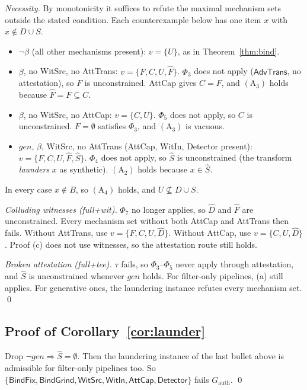 \emph{Necessity.} By monotonicity it suffices to refute the maximal mechanism sets outside
the stated condition. Each counterexample below has one item $x$ with $x\notin D\cup S$.
\begin{itemize}
\item $\neg\beta$ (all other mechanisms present): $v=\{U\}$, as in Theorem~\ref{thm:bind}.
\item $\beta$, no \textsf{WitSrc}, no \textsf{AttTrans}: $v=\{F,C,U,\hat F\}$. $\Phi_3$ does not
  apply ($\textsf{AdvTrans}$, no attestation), so $F$ is unconstrained.
  \textsf{AttCap} gives $C=F$, and $(\mathrm A_3)$ holds because $\hat F=F\subseteq C$.
\item $\beta$, no \textsf{WitSrc}, no \textsf{AttCap}: $v=\{C,U\}$. $\Phi_5$ does not apply,
  so $C$ is unconstrained. $F=\emptyset$ satisfies $\Phi_3$, and $(\mathrm A_3)$ is vacuous.
\item $\mathit{gen}$, $\beta$, \textsf{WitSrc}, no \textsf{AttTrans} (\textsf{AttCap},
  \textsf{WitIn}, \textsf{Detector} present): $v=\{F,C,U,\hat F,\hat S\}$. $\Phi_4$ does not
  apply, so $\hat S$ is unconstrained (the transform \emph{launders} $x$ as synthetic).
  $(\mathrm A_2)$ holds because $x\in\hat S$.
\end{itemize}
In every case $x\notin B$, so $(\mathrm A_4)$ holds, and $U\not\subseteq D\cup S$.

\emph{Colluding witnesses (full+wit).} $\Phi_7$ no longer applies, so $\hat D$ and
$\hat F$ are unconstrained. Every mechanism set without both \textsf{AttCap} and
\textsf{AttTrans} then fails. Without \textsf{AttTrans}, use $v=\{F,C,U,\hat D\}$.
Without \textsf{AttCap}, use $v=\{C,U,\hat D\}$. Proof (c) does not use witnesses, so the
attestation route still holds.

\emph{Broken attestation (full+tee).} $\tau$ fails, so $\Phi_3$--$\Phi_5$ never apply
through attestation, and $\hat S$ is unconstrained whenever $\mathit{gen}$ holds. For
filter-only pipelines, (a) still applies. For generative ones, the laundering instance
refutes every mechanism set. \qed

\subsection*{Proof of Corollary~\ref{cor:launder}}

Drop $\neg\mathit{gen}\Rightarrow\hat S=\emptyset$. Then the laundering instance of the last
bullet above is admissible for filter-only pipelines too. So
$\{\textsf{BindFix},\textsf{BindGrind},\textsf{WitSrc},\textsf{WitIn},\textsf{AttCap},\textsf{Detector}\}$
fails $G_{\mathrm{auth}}$. \qed

